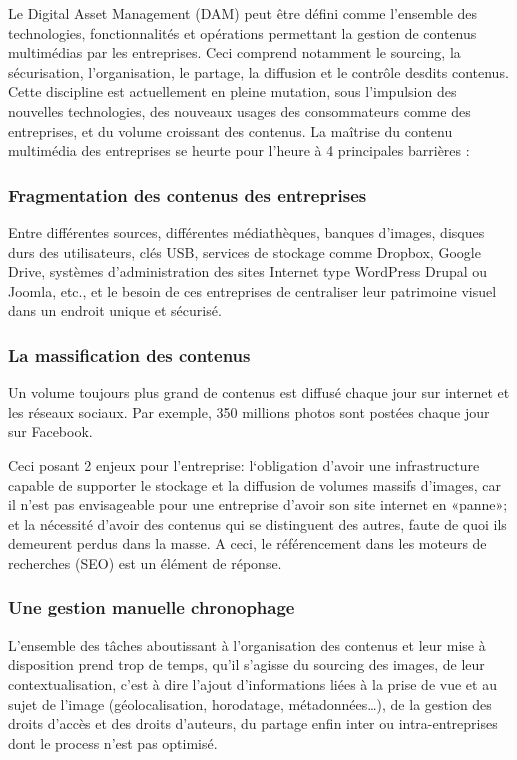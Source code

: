 Le Digital Asset Management (DAM) peut être défini comme l’ensemble des technologies, fonctionnalités et opérations permettant la gestion de contenus multimédias par les entreprises. Ceci comprend notamment le sourcing, la sécurisation, l’organisation, le partage, la diffusion et le contrôle desdits contenus. Cette discipline est actuellement en pleine mutation, sous l’impulsion des nouvelles technologies, des nouveaux usages des consommateurs comme des entreprises, et du volume croissant des contenus. La maîtrise du contenu multimédia des entreprises se heurte pour l’heure à 4 principales barrières :

\subsubsection{Fragmentation des contenus des entreprises}{} 
Entre différentes sources, différentes médiathèques,
banques d’images, disques durs des utilisateurs, clés USB, services de stockage comme Dropbox,
Google Drive, systèmes d’administration des sites Internet type WordPress Drupal ou Joomla, etc.,
et le besoin de ces entreprises de centraliser leur patrimoine visuel dans un endroit unique et
sécurisé.

\subsubsection*{La massification des contenus}{} 
 Un volume toujours plus grand de contenus est diffusé chaque jour
sur internet et les réseaux sociaux. Par exemple, 350 millions photos sont postées chaque jour sur
Facebook. 

Ceci posant 2 enjeux pour l’entreprise: l‘obligation d’avoir une infrastructure capable de
supporter le stockage et la diffusion de volumes massifs d’images, car il n’est pas envisageable pour
une entreprise d’avoir son site internet en «panne»; et la nécessité d’avoir des contenus qui se
distinguent des autres, faute de quoi ils demeurent perdus dans la masse. A ceci, le référencement
dans les moteurs de recherches (SEO) est un élément de réponse.
\newline

\subsubsection{Une gestion manuelle chronophage}{}  
 L’ensemble des tâches aboutissant à l’organisation des contenus et leur mise à disposition prend trop de temps, qu’il s’agisse du sourcing des images, de
leur contextualisation, c’est à dire l’ajout d’informations liées à la prise de vue et au sujet de l’image
(géolocalisation, horodatage, métadonnées…), de la gestion des droits d’accès et des droits
d’auteurs, du partage enfin inter ou intra-entreprises dont le process n’est pas optimisé.

